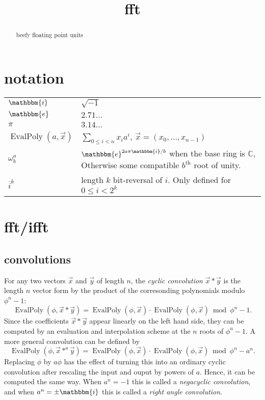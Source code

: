 \documentclass[12 pt]{amsart}
\newcommand{\om}[2] {\omega_{#1}^{#2}}
\newcommand{\ee}[0] {\mathbbm{e}}
\newcommand{\ii}[0] {\mathbbm{i}}
\begin{document}
\title{fft}
\maketitle

\begin{abstract}
beefy floating point units
\end{abstract}

\section{notation}

\begin{tabular}{l|l}
$\ii$ & $\sqrt{-1}$ \\
$\ee$ & $2.71\dots$ \\
$\pi$ & $3.14\dots$ \\
$\operatorname{EvalPoly}(a, \vec{x})$ & $\sum_{0 \le i < n} x_i a^i$, $\vec{x} = (x_0, \dots, x_{n-1})$\\
$\om{b}{a}$ & $\ee^{2 a \pi \ii / b}$ when the base ring is $\mathbb{C}$, 
Otherwise some compatible $b^{\text{th}}$ root of unity.\\
$\overline{i}^k$ & length $k$ bit-reversal of $i$. Only defined for $0 \le i < 2^k$\\
\end{tabular} 

\section{fft/ifft}

\subsection{convolutions}
For any two vectors $\vec{x}$ and $\vec{y}$ of length $n$, the
\emph{cyclic convolution} $\vec{x}*\vec{y}$ is the length $n$ vector form by the
product of the corresonding polynomials modulo $\phi^n-1$:
\begin{equation*}
\operatorname{EvalPoly}(\phi, \vec{x}*\vec{y}) = \operatorname{EvalPoly}(\phi, \vec{x}) \cdot \operatorname{EvalPoly}(\phi, \vec{x}) \bmod \phi^n-1\text{.}
\end{equation*}
Since the coefficients $\vec{x}*\vec{y}$ appear linearly on the left hand side,
they can be computed by an evaluation and interpolation scheme at the $n$ roots
of $\phi^n-1$. A more general convolution can be defined by
\begin{equation*}
\operatorname{EvalPoly}(\phi, \vec{x}*^a\vec{y}) = \operatorname{EvalPoly}(\phi, \vec{x}) \cdot \operatorname{EvalPoly}(\phi, \vec{x}) \bmod \phi^n-a^n\text{.}
\end{equation*}
Replacing $\phi$ by $a\phi$ has the effect of turning this into an ordinary
cyclic convolution after rescaling the input and ouput by powers of $a$. Hence,
it can be computed the same way. When $a^n = -1$ this is called a
\emph{negacyclic convolution}, and when $a^n = \pm \ii$ this is called a
\emph{right angle convolution}.
\end{document}
